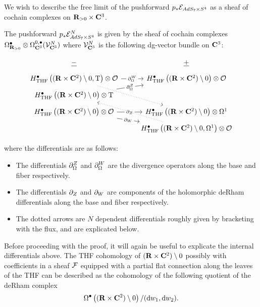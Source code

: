 \documentclass[../main.tex]{subfiles}
\begin{document}
We wish to describe the free limit of the pushforward $p_* \mathcal{E}_{AdS_7\times S^4}$ as a sheaf of cochain complexes on $\mathbf{R}_{>0}\times \mathbf{C}^3$. 

\begin{prop}\label{prop:ads7push}
The pushforward $p_* \mathcal{E}^N_{AdS_7\times S^4}$ is given by the sheaf of cochain complexes $\Omega^\bullet_{\mathbf{R}_{>0}} \otimes \Omega^{0,\bullet}_{\mathbf{C}^3} (\mathcal{V}^N_{\mathbf{C}^3})$ where $\mathcal{V}^N_{\mathbf{C}^3}$ is the following dg-vector bundle on $\mathbf{C}^3$:

\begin{equation}
  \label{eqn:ads7push} 
  \begin{tikzcd}[row sep = 1 ex]
    \ul{-} & \ul{+} \\
H^\bullet_{\mr{THF}} \left ((\R\times \C^2)\setminus 0, \T \right ) \otimes \mc{O}\ar[r, "\del^W_\Omega" description]\ar[ddr, dotted] & H^\bullet_{\mr{THF}} \left ((\R\times \C^2)\setminus 0 \right ) \otimes \mc O \\
H^\bullet_{\mr{THF}} \left ((\R\times \C^2)\setminus 0 \right )  \otimes \T\ar[ur, "\del^Z_\Omega" description] \\
H^\bullet_{\mr{THF}} \left ((\R\times \C^2)\setminus 0 \right )\otimes \mc{O}\ar[r, "\del_Z" description]\ar[dr, "\del_W" description] & H^\bullet_{\mr{THF}} \left ((\R\times \C^2)\setminus 0 \right ) \otimes \Omega^1 \\ & H^\bullet_{\mr{THF}} \left ((\R\times \C^2)\setminus 0, \Omega^1 \right )  \otimes \mc O\ar[uul, dotted]
\end{tikzcd}
\end{equation}

where the differentials are as follows:

\begin{itemize}
\item The differentials $\partial_\Omega^Z$ and $\partial_\Omega^W$ are the divergence operators along the base and fiber respectively.
\item The differentials $\partial_Z$ and $\partial_W$ are components of the holomorphic deRham differentials along the base and fiber respectively.
\item The dotted arrows are $N$ dependent differentials roughly given by bracketing with the flux, and are explicated below. 
\end{itemize}
\end{prop}

Before proceeding with the proof, it will again be useful to explicate the internal differentials above. The THF cohomology of $(\mathbf{R}\times \mathbf{C}^2) \setminus 0$ possibly with coefficients in a sheaf $\mathcal{F}$ equipped with a partial flat connection along the leaves of the THF can be described as the cohomology of the following quotient of the deRham complex 
\[\Omega^\bullet \left ((\mathbf{R}\times \mathbf{C}^2) \setminus 0 \right) / (\mathrm{d} w_1, \mathrm{d} w_2) .\] 
\end{document}
